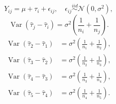 \documentclass{article}
\begin{document}
\[
	Y_{ij} = \mu + \tau_i + \epsilon_{ij}, \quad \epsilon_{ij} \overset{iid}{\sim} \mathcal{N}(0, \sigma^2),
\]
\[
	\operatorname{Var}(\hat{\tau}_j - \hat{\tau}_i) = \sigma^2 \left( \frac{1}{n_i} + \frac{1}{n_j} \right).
\]
\begin{align*}
	\operatorname{Var}(\hat{\tau}_2 - \hat{\tau}_1) & = \sigma^2\left( \frac{1}{n_1} + \frac{1}{n_2} \right), \\
	\operatorname{Var}(\hat{\tau}_3 - \hat{\tau}_2) & = \sigma^2\left( \frac{1}{n_2} + \frac{1}{n_3} \right), \\
	\operatorname{Var}(\hat{\tau}_4 - \hat{\tau}_3) & = \sigma^2\left( \frac{1}{n_3} + \frac{1}{n_4} \right), \\
	\operatorname{Var}(\hat{\tau}_5 - \hat{\tau}_4) & = \sigma^2\left( \frac{1}{n_4} + \frac{1}{n_5} \right).
\end{align*}
\end{document}
